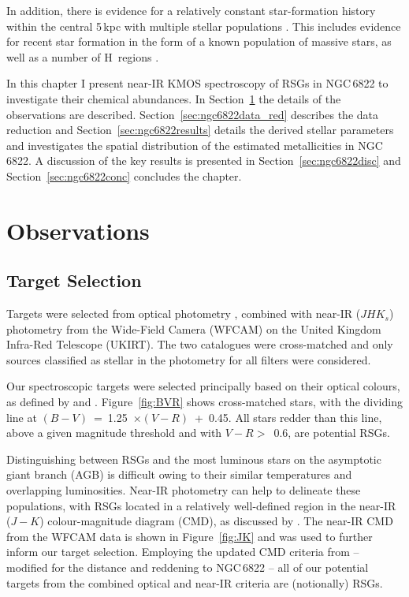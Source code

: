 In addition, there is evidence for a relatively constant star-formation history within the central 5\,kpc
\citep{2014ApJ...789..147W}
with multiple stellar populations
\citep{2006A&A...451...99B,2012A&A...540A.135S}.
This includes evidence for recent star formation in the form of a known population of massive stars, as well as a number of H\,\2 regions
\citep{2001ApJ...547..765V,2006AJ....131..343D,2009A&A...505.1027H,2012AJ....144....2L}.

In this chapter I present near-IR KMOS spectroscopy of RSGs in NGC\,6822 to investigate their chemical abundances.
In Section~\ref{sec:ngc6822obs} the details of the observations are described.
Section~\ref{sec:ngc6822data_red} describes the data reduction and
Section~\ref{sec:ngc6822results} details the derived stellar parameters and investigates the spatial distribution of the estimated metallicities in NGC\,6822.
A discussion of the key results is presented in Section~\ref{sec:ngc6822disc} and
Section~\ref{sec:ngc6822conc} concludes the chapter.


\section{Observations}
\label{sec:ngc6822obs}

\subsection{Target Selection} %
\label{sub:target_selection}

Targets were selected from optical photometry
\citep{2007AJ....134.2474M}, combined with near-IR ($JHK{_s}$) photometry
\cite[for details see][]{2012A&A...540A.135S} from the Wide-Field Camera (WFCAM) on the United Kingdom Infra-Red Telescope (UKIRT).
The two catalogues were cross-matched and only sources classified as stellar in the photometry for all filters were considered.

Our spectroscopic targets were selected principally based on their optical colours, as defined by
\cite{1998ApJ...501..153M} and
\cite{2012AJ....144....2L}.
Figure~\ref{fig:BVR} shows cross-matched stars, with the dividing line at
$(B - V)$~=~1.25~$\times (V - R)$~+~0.45.
All stars redder than this line, above a given magnitude threshold and with
$V - R >$~0.6, are potential RSGs.

Distinguishing between RSGs and the most luminous stars on the asymptotic giant branch
(AGB) is difficult owing to their similar temperatures and overlapping luminosities.
Near-IR photometry can help to delineate these populations,
with RSGs located in a relatively well-defined region in the near-IR ($J-K$) colour-magnitude diagram (CMD), as discussed by
\cite{2000ApJ...542..804N}.
The near-IR CMD from the WFCAM data is shown in
Figure~\ref{fig:JK} and was used to further inform our target selection.
Employing the updated CMD criteria from
\cite{2014A&A...562A..32C}  -- modified for the distance and reddening to NGC\,6822 --
all of our potential targets from the combined optical and near-IR criteria are (notionally) RSGs.


